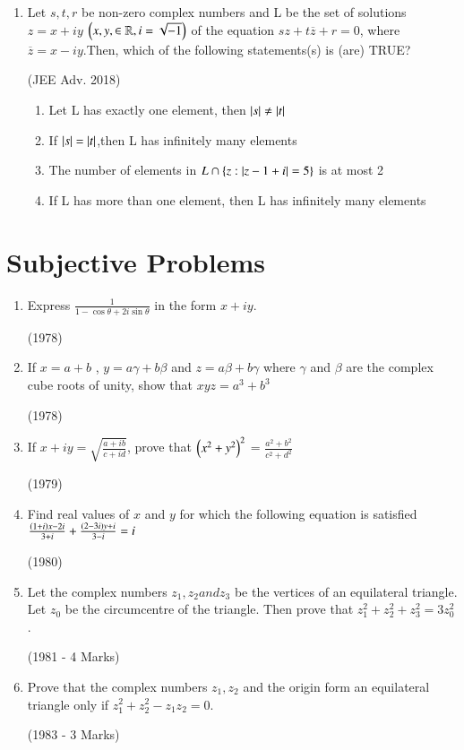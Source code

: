\documentclass[journal,12pt,twocolumn]{IEEEtran}
\theoremstyle{remark}
\begin{document}
\begin{enumerate}
    \item Let $ s, t, r $ be non-zero complex numbers and L be the set of solutions  $ z = x + iy $ $ \left(x,y, \in \mathbb{R},i=\sqrt{-1}\right) $ of the equation $ sz + t\overline{z} + r = 0 $, where $ \overline{z}=x-iy $.Then, which of the following statements(s) is (are) TRUE?

    \hfill (JEE Adv. 2018)

    \begin{enumerate}[label=\alph*.]
    \item Let L has exactly one element, then $ \left\vert s\right\vert \ne \left\vert t\right\vert $
    \item If $ \left\vert s\right\vert = \left\vert t\right\vert $,then L has infinitely many elements 
    \item The number of elements in $ L \cap \left\{z:|z-1+i|=5\right\} $ is at most 2
    \item If L has more than one element, then L has infinitely many elements 
    \end{enumerate}

    \end{enumerate}

    \section{Subjective Problems}

    \begin{enumerate}
    
    \item Express $ \frac{1}{1-\cos\theta +2i\sin\theta} $ in the form $ x + iy $.

    \hfill (1978)

    \item If $ x = a + b $ , $ y = a\gamma + b\beta $ and $ z = a\beta + b\gamma $ where $ \gamma $ and $ \beta $ are the complex cube roots of unity, show that $ xyz = a^3 + b^3 $

    \hfill (1978)

    \item If $ x + iy =\sqrt{\frac{a + ib}{c + id}} $, prove that $ \left(x^2 + y^2\right)^2 $ = $ \frac{a^2 + b^2}{c^2 + d^2} $

    \hfill (1979)

    \item Find real values of $ x $ and $ y $ for which the following equation is satisfied $ \frac{\left(1 + i\right)x - 2i}{3 + i} + \frac{\left(2 - 3i\right)y + i}{3 - i} = i $

    \hfill (1980)

    \item Let the complex numbers $ z_1 , z_2 and z_3 $ be the vertices of an equilateral triangle. Let $ z_0 $ be the circumcentre of the triangle. Then prove that $ z_1^2 + z_2^2 + z_3^2 = 3z_0^2 $.

    \hfill (1981 - 4 Marks)

    \item Prove that the complex numbers $ z_1,z_2 $ and the origin form an equilateral triangle only if $ z_1^2 + z_2^2 - z_1z_2 = 0 $.

    \hfill (1983 - 3 Marks)
    \end{enumerate} 
    
    
\end{document}
